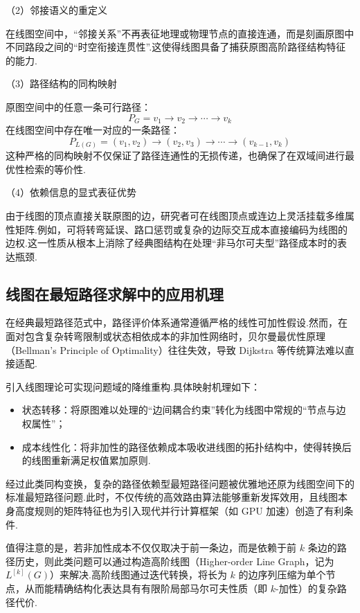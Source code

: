 （2）邻接语义的重定义

在线图空间中，“邻接关系”不再表征地理或物理节点的直接连通，而是刻画原图中不同路段之间的“时空衔接连贯性”.这使得线图具备了捕获原图高阶路径结构特征的能力.

（3）路径结构的同构映射

原图空间中的任意一条可行路径：
$$ P_G = v_1 \rightarrow v_2 \rightarrow \cdots \rightarrow v_k $$ 
在线图空间中存在唯一对应的一条路径：
$$ P_{L(G)} = (v_1,v_2) \rightarrow (v_2,v_3) \rightarrow \cdots \rightarrow (v_{k-1},v_k) $$ 
这种严格的同构映射不仅保证了路径连通性的无损传递，也确保了在双域间进行最优性检索的等价性.

（4）依赖信息的显式表征优势

由于线图的顶点直接关联原图的边，研究者可在线图顶点或连边上灵活挂载多维属性矩阵.例如，可将转弯延误、路口惩罚或复杂的边际交互成本直接编码为线图的边权.这一性质从根本上消除了经典图结构在处理“非马尔可夫型”路径成本时的表达瓶颈.

\subsection{线图在最短路径求解中的应用机理}

在经典最短路径范式中，路径评价体系通常遵循严格的线性可加性假设.然而，在面对包含复杂转弯限制或状态相依成本的非加性网络时，贝尔曼最优性原理（Bellman's Principle of Optimality）往往失效，导致 Dijkstra 等传统算法难以直接适配.

引入线图理论可实现问题域的降维重构.具体映射机理如下：

\begin{itemize}
  \item 状态转移：将原图难以处理的“边间耦合约束”转化为线图中常规的“节点与边权属性”；
  \item 成本线性化：将非加性的路径依赖成本吸收进线图的拓扑结构中，使得转换后的线图重新满足权值累加原则.
\end{itemize}

经过此类同构变换，复杂的路径依赖型最短路径问题被优雅地还原为线图空间下的标准最短路径问题.此时，不仅传统的高效路由算法能够重新发挥效用，且线图本身高度规则的矩阵特征也为引入现代并行计算框架（如 GPU 加速）创造了有利条件.

值得注意的是，若非加性成本不仅仅取决于前一条边，而是依赖于前 $k$ 条边的路径历史，则此类问题可以通过构造高阶线图（Higher-order Line Graph，记为 $L^{[k]}(G)$）来解决.高阶线图通过迭代转换，将长为 $k$ 的边序列压缩为单个节点，从而能精确结构化表达具有有限阶局部马尔可夫性质（即 $k$-加性）的复杂路径代价.

